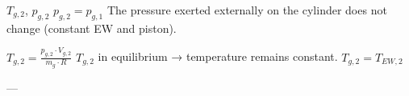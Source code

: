\( T_{g,2} \), \( p_{g,2} \)  
\( p_{g,2} = p_{g,1} \)  
The pressure exerted externally on the cylinder does not change (constant EW and piston).  

\( T_{g,2} = \frac{p_{g,2} \cdot V_{g,2}}{m_g \cdot R} \)  
\( T_{g,2} \) in equilibrium → temperature remains constant.  
\( T_{g,2} = T_{EW,2} \)  

---